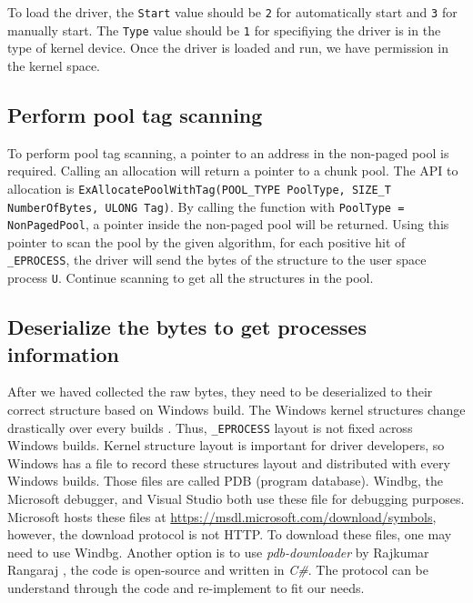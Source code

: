 To load the driver, the \texttt{Start} value should be \texttt{2} for automatically start and \texttt{3} for manually start. The \texttt{Type} value should be \texttt{1} for specifiying the driver is in the type of kernel device. Once the driver is loaded and run, we have permission in the kernel space.

\subsection[Perform pool tag scanning]{Perform pool tag scanning}

To perform pool tag scanning, a pointer to an address in the non-paged pool is required. Calling an allocation will return a pointer to a chunk pool. The API to allocation is \texttt{ExAllocatePoolWithTag(POOL\_TYPE PoolType, SIZE\_T NumberOfBytes, ULONG Tag)}. By calling the function with \texttt{PoolType = NonPagedPool}, a pointer inside the non-paged pool will be returned. Using this pointer to scan the pool by the given algorithm, for each positive hit of \texttt{\_EPROCESS}, the driver will send the bytes of the structure to the user space process \texttt{U}. Continue scanning to get all the structures in the pool.

\subsection[Deserialize the bytes to get processes information]{Deserialize the bytes to get processes information}

After we haved collected the raw bytes, they need to be deserialized to their correct structure based on Windows build. The Windows kernel structures change drastically over every builds \cite{windowsKernelCharacterization}. Thus, \texttt{\_EPROCESS} layout is not fixed across Windows builds. Kernel structure layout is important for driver developers, so Windows has a file to record these structures layout and distributed with every Windows builds. Those files are called PDB (program database). Windbg, the Microsoft debugger, and Visual Studio both use these file for debugging purposes. Microsoft hosts these files at \url{https://msdl.microsoft.com/download/symbols}, however, the download protocol is not HTTP. To download these files, one may need to use Windbg. Another option is to use \textit{pdb-downloader} by Rajkumar Rangaraj \cite{pdb-downloader}, the code is open-source and written in \textit{C\#}. The protocol can be understand through the code and re-implement to fit our needs.

